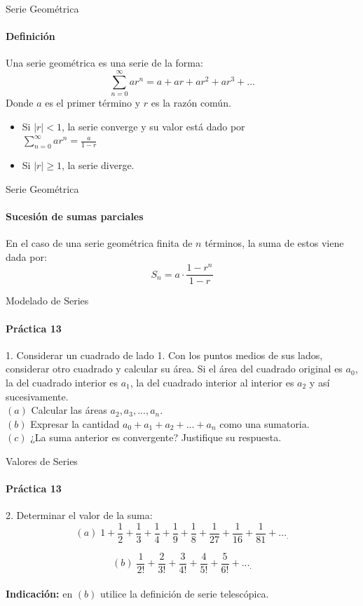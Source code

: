 \documentclass{plantillaPPT}
\begin{document}
\primeraDiapo

\begin{frame}{Serie Geométrica}
\framesubtitle{Definición}

\begin{definicion}
    Una serie geométrica es una serie de la forma:
    \[
    \sum_{n=0}^{\infty}ar^n = a+ar+ar^2+ar^3+...
    \]
    Donde \(a\) es el primer término y \(r\) es la razón común.
    \begin{itemize}
        \item Si \(|r|<1\), la serie converge y su valor está dado por \\[1ex]
        \(\displaystyle\sum_{n=0}^{\infty}ar^n = \frac{a}{1-r}\)\\[2ex]
        \item Si \(|r|\geq1\), la serie diverge.
    \end{itemize}
\end{definicion}
    
\end{frame}

\begin{frame}{Serie Geométrica}
\framesubtitle{Sucesión de sumas parciales}

En el caso de una serie geométrica finita de \(n\) términos, la suma de estos viene dada por:
\[S_n=a\cdot\frac{1-r^n}{1-r}\]
    
\end{frame}

\begin{frame}{Modelado de Series}
\framesubtitle{Práctica 13}

1. Considerar un cuadrado de lado 1. Con los puntos medios de sus lados, considerar otro cuadrado y calcular su área. Si el área del cuadrado original es \(a_0\), la del cuadrado interior es \(a_1\), la del cuadrado interior al interior es \(a_2\) y así sucesivamente.\\[3ex]
\((a)\) Calcular las áreas \(a_2,a_3,...,a_n\). \\[2ex]
\((b)\) Expresar la cantidad \(a_0+a_1+a_2+...+a_n\) como una sumatoria.\\[2ex]
\((c)\) ¿La suma anterior es convergente? Justifique su respuesta.\\[2ex]

\end{frame}

\begin{frame}{Valores de Series}
\framesubtitle{Práctica 13}

2. Determinar el valor de la suma:\\[2ex]
\[(a)\;1+\frac{1}{2}+\frac{1}{3}+\frac{1}{4}+\frac{1}{9}+\frac{1}{8}+\frac{1}{27}+\frac{1}{16}+\frac{1}{81}+..._.\]

\[(b)\;\frac{1}{2!}+\frac{2}{3!}+\frac{3}{4!}+\frac{4}{5!}+\frac{5}{6!}+..._.\] \\[2ex]

\textbf{Indicación: }en \((b)\) utilice la definición de serie telescópica.

\end{frame}
\end{document}
